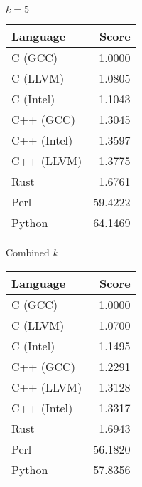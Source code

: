 \begin{subtable}{0.33\textwidth}
    \centering
    \caption{$k=5$}
    \label{table:runtime:dfa_gap(5)}
    \begin{tabular}{|l|r|}
        \hline
        Language & Score \\
        \hline
        C (GCC) & 1.0000 \\
        C (LLVM) & 1.0805 \\
        C (Intel) & 1.1043 \\
        C++ (GCC) & 1.3045 \\
        C++ (Intel) & 1.3597 \\
        C++ (LLVM) & 1.3775 \\
        Rust & 1.6761 \\
        Perl & 59.4222 \\
        Python & 64.1469 \\
        \hline
    \end{tabular}
\end{subtable}%
\begin{subtable}{0.33\textwidth}
    \centering
    \caption{Combined $k$}
    \label{table:runtime:dfa_gap:combined}
    \begin{tabular}{|l|r|}
        \hline
        Language & Score \\
        \hline
        C (GCC) & 1.0000 \\
        C (LLVM) & 1.0700 \\
        C (Intel) & 1.1495 \\
        C++ (GCC) & 1.2291 \\
        C++ (LLVM) & 1.3128 \\
        C++ (Intel) & 1.3317 \\
        Rust & 1.6943 \\
        Perl & 56.1820 \\
        Python & 57.8356 \\
        \hline
    \end{tabular}
\end{subtable}